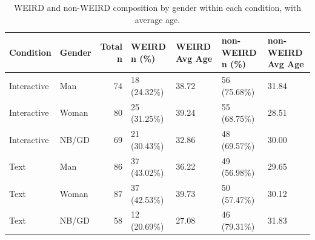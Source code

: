 \begin{table}
\caption{WEIRD and non-WEIRD composition by gender within each condition, with average age.}
\label{tab:weird-normal-gender-condition}
\begin{tabular}{llrllll}
\toprule
Condition & Gender & Total n & WEIRD n (\%) & WEIRD Avg Age & non-WEIRD n (\%) & non-WEIRD Avg Age \\
\midrule
Interactive & Man & 74 & 18 (24.32\%) & 38.72 & 56 (75.68\%) & 31.84 \\
Interactive & Woman & 80 & 25 (31.25\%) & 39.24 & 55 (68.75\%) & 28.51 \\
Interactive & NB/GD & 69 & 21 (30.43\%) & 32.86 & 48 (69.57\%) & 30.00 \\
Text & Man & 86 & 37 (43.02\%) & 36.22 & 49 (56.98\%) & 29.65 \\
Text & Woman & 87 & 37 (42.53\%) & 39.73 & 50 (57.47\%) & 30.12 \\
Text & NB/GD & 58 & 12 (20.69\%) & 27.08 & 46 (79.31\%) & 31.83 \\
\bottomrule
\end{tabular}
\end{table}

